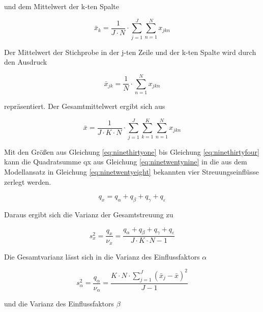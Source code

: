 \noindent und dem Mittelwert der k-ten Spalte

\begin{equation}\label{eq:ninethirtytwo}
\bar{x}_{k} =\dfrac{1}{J\cdot N} \cdot \sum _{j=1}^{J}\sum _{n=1}^{N}x_{jkn} 
\end{equation}

\noindent Der Mittelwert der Stichprobe in der j-ten Zeile und der k-ten Spalte wird durch den Ausdruck

\begin{equation}\label{eq:ninethirtythree}
\bar{x}_{jk} =\dfrac{1}{N} \cdot \sum _{n=1}^{N}x_{jkn} 
\end{equation}

\noindent repr\"{a}sentiert. Der Gesamtmittelwert ergibt sich aus

\begin{equation}\label{eq:ninethirtyfour}
\bar{x}=\dfrac{1}{J\cdot K\cdot N} \cdot \sum _{j=1}^{J}\sum _{k=1}^{K}\sum _{n=1}^{N}x_{jkn}
\end{equation}

\noindent Mit den Gr\"{o}{\ss}en aus Gleichung \eqref{eq:ninethirtyone} bis Gleichung \eqref{eq:ninethirtyfour} kann die Quadratsumme qx aus Gleichung \eqref{eq:ninetwentynine} in die aus dem Modellansatz in Gleichung \eqref{eq:ninetwentyeight} bekannten vier Streuungseinfl\"{u}sse zerlegt werden. 

\begin{equation}\label{eq:ninethirtyfive}
q_{x} =q_{\alpha } +q_{\beta } +q_{\gamma } +q_{\varepsilon }
\end{equation}

\noindent Daraus ergibt sich die Varianz der Gesamtstreuung zu

\begin{equation}\label{eq:ninethirtysix}
s_{x}^{2} =\dfrac{q_{x}}{\nu _{x}} =\dfrac{q_{\alpha} +q_{\beta} +q_{\gamma} +q_{\varepsilon}}{J\cdot K\cdot N-1}
\end{equation}

\noindent Die Gesamtvarianz l\"{a}sst sich in die Varianz des Einflussfaktors $\alpha$

\begin{equation}\label{eq:ninethirtyseven}
s_{\alpha}^{2} =\dfrac{q_{\alpha}}{\nu _{\alpha}} =\dfrac{K\cdot N\cdot \sum _{j=1}^{J}\left(\bar{x}_{j} -\bar{x}\right)^{2}}{J-1}
\end{equation}

\noindent und die Varianz des Einflussfaktors $\beta$

